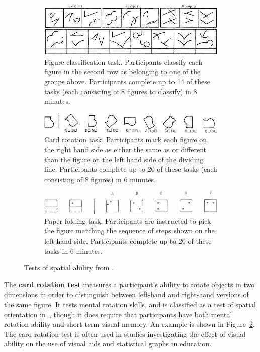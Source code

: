 \documentclass[11pt]{isuthesis}\usepackage[]{graphicx}\usepackage[]{color}
\begin{document}
\begin{figure}[ht]
  \centering
  \begin{subfigure}[b]{.75\linewidth}
  \includegraphics[width=\linewidth]{figureclassification}
  \caption[Figure classification task]{Figure classification task. Participants classify each figure in the second row as belonging to one of the groups above. Participants complete up to 14 of these tasks (each consisting of 8 figures to classify) in 8 minutes.\label{fig:figureclassification}}
  \end{subfigure}
  \begin{subfigure}[b]{.75\linewidth}
  \includegraphics[width=\linewidth]{cardrotation}
  \caption[Card rotation task]{Card rotation task. Participants mark each figure on the right hand side as either the same as or different than the figure on the left hand side of the dividing line. Participants complete up to 20 of these tasks (each consisting of 8 figures) in 6 minutes.\label{fig:cardrotation}}
  \end{subfigure}
  \begin{subfigure}[b]{.75\linewidth}
  \includegraphics[width=\linewidth]{paperfolding}
  \caption[Paper folding task]{Paper folding task. Participants are instructed to pick the figure matching the sequence of steps shown on the left-hand side. Participants  complete up to 20 of these tasks in 6 minutes.\label{fig:paperfolding}}
  \end{subfigure}
  \caption[Tests of spatial ability]{Tests of spatial ability from \protect\citet{ekstrom1976manual}.}   \label{fig:tests}
\end{figure}
  
The \textbf{card rotation test} measures a participant's ability to rotate objects in two dimensions in order to distinguish between left-hand and right-hand versions of the same figure. It tests mental rotation skills, and is classified as a test of spatial orientation in~\citep{ekstrom1976manual}, though it does require that participants have both mental rotation ability and short-term visual memory. An example is shown in Figure~\ref{fig:cardrotation}. 
The card rotation test is often used in studies investigating the effect of visual ability on the use of visual aids \citep{mayer1994whom} and statistical graphs \citep{lowrie2007solving} in education.
\end{document}
